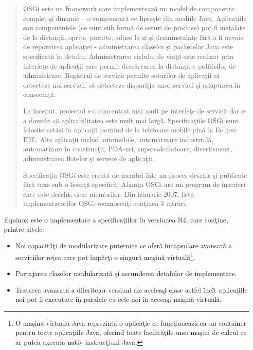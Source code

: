 \begin{quotation}
OSGi este un framework care implementează un model de componente complet şi 
dinamic -- o componentă ce lipseşte din mediile Java. Aplicaţiile sau 
componentele (ce sunt sub formă de seturi de produse) pot fi instalate de la 
distanţă, oprite, pornite, aduse la zi şi dezininstalate fără a fi nevoie de 
repornirea aplicaţiei - administrarea claselor şi pachetelor Java este 
specificată în detaliu. Administrarea ciclului de viaţă este realizat prin 
interfeţe de aplicaţii care permit descărcarea la distanţă a politicilor de 
administrare. Registrul de servicii permite seturilor de aplicaţii să detecteze 
noi servicii, să detecteze dispariţia unor servicii şi adaptarea în consecinţă.

La început, proiectul s-a concentrat mai mult pe interfeţe de servicii dar s-a 
dovedit că aplicabilitatea este mult mai largă. Specificaţiile OSGi sunt 
folosite astăzi în aplicaţii pornind de la telefoane mobile pînă la Eclipse 
IDE. Alte aplicaţii includ automobile, automatizare industrială, automatizare 
în construcţii, PDA-uri, supercalculatoare, divertisment, administrarea 
flotelor şi servere de aplicaţii.

Specificaţia OSGi este creată de membri într-un proces deschis şi publicate 
fără taxe sub o licenţă specifică. Alianţa OSGi are un program de înscrieri 
care este deschis doar membrilor. Din ianuarie 2007, lista implementatorilor 
OSGi recunoscuţi conţinea 3 intrări.
\cite{osgiwiki}
\end{quotation}

Equinox este o implementare a specificaţiilor în versiunea 
R4, care conţine, printre altele\cite{osgiwiki}:

\begin{itemize}
  \item Noi capacităţi de modularizare puternice ce oferă încapsulare avansată 
  a serviciilor reţea care pot împărţi o singură maşină virtuală\footnote{O 
  maşină virtuală Java reprezintă o aplicaţie ce funcţionează ca un container 
  pentru toate aplicaţiile Java, oferind toate facilităţile unei maşini de 
  calcul ce ar putea executa nativ instrucţiuni Java.}.
  \item Partajarea claselor modularizată şi ascunderea detaliilor de 
  implementare.
  \item Tratarea avansată a diferitelor versiuni ale aceleaşi clase astfel 
  încît aplicaţiile noi pot fi executate în paralele cu cele noi în aceeaşi 
  maşină virtuală.
\end{itemize}

